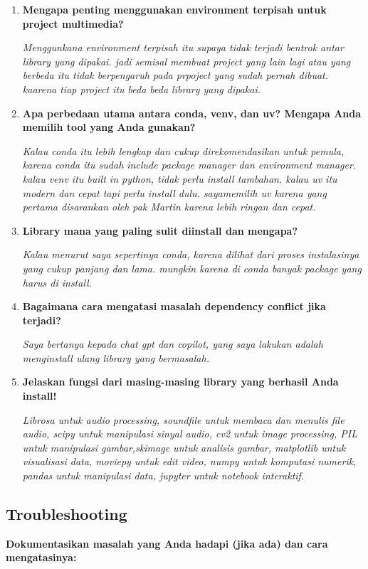 \documentclass[11pt,a4paper]{article}
\begin{document}
\begin{enumerate}
    \item \textbf{Mengapa penting menggunakan environment terpisah untuk project multimedia?}
    
    \textit{Menggunkana environment terpisah itu supaya tidak terjadi bentrok antar library yang dipakai. jadi semisal membuat project yang lain lagi atau yang berbeda itu tidak berpengaruh pada prpoject yang sudah pernah dibuat. kaarena tiap project itu beda beda library yang dipakai.}
    
    \item \textbf{Apa perbedaan utama antara conda, venv, dan uv? Mengapa Anda memilih tool yang Anda gunakan?}
    
    \textit{Kalau conda itu lebih lengkap dan cukup direkomendasikan untuk pemula, karena conda itu sudah include package manager dan environment manager. kalau venv itu built in python, tidak perlu install tambahan. kalau uv itu modern dan cepat tapi perlu install dulu. sayamemilih uv karena yang pertama disarankan oleh pak Martin karena lebih ringan dan cepat.}
    
    \item \textbf{Library mana yang paling sulit diinstall dan mengapa?}
    
    \textit{Kalau menurut saya sepertinya conda, karena dilihat dari proses instalasinya yang cukup panjang dan lama. mungkin karena di conda banyak package yang harus di install.}
    
    \item \textbf{Bagaimana cara mengatasi masalah dependency conflict jika terjadi?}
    
    \textit{Saya bertanya kepada chat gpt dan copilot, yang saya lakukan adalah menginstall ulang library yang bermasalah.}
    
    \item \textbf{Jelaskan fungsi dari masing-masing library yang berhasil Anda install!}
    
    \textit{Librosa untuk audio processing, soundfile untuk membaca dan menulis file audio, scipy untuk manipulasi sinyal audio, cv2 untuk image processing, PIL untuk manipulasi gambar,skimage untuk analisis gambar, matplotlib untuk visualisasi data, moviepy untuk edit video, numpy untuk komputasi numerik, pandas untuk manipulasi data, jupyter untuk notebook interaktif.}
\end{enumerate}

\subsection{Troubleshooting}
\textbf{Dokumentasikan masalah yang Anda hadapi (jika ada) dan cara mengatasinya:}
\end{document}

